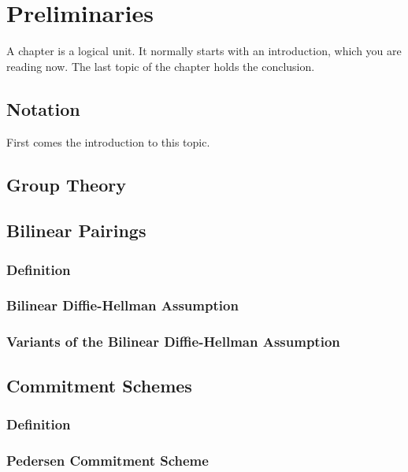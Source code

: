 \chapter{Preliminaries}
\label{cha:1}
A chapter is a logical unit. It normally starts with an introduction, which
you are reading now. The last topic of the chapter holds the conclusion.

\section{Notation}
First comes the introduction to this topic.

\lipsum[55]

\section{Group Theory}
\lipsum[33]

\section{Bilinear Pairings}
\lipsum[64]

\subsection{Definition}
\lipsum[56-57]

\subsection{Bilinear Diffie-Hellman Assumption}
\lipsum[58]

\subsection{Variants of the Bilinear Diffie-Hellman Assumption}
\lipsum[59]

\section{Commitment Schemes}
\lipsum[60]

\subsection{Definition}
\lipsum[61]

\subsection{Pedersen Commitment Scheme}
\lipsum[62]

